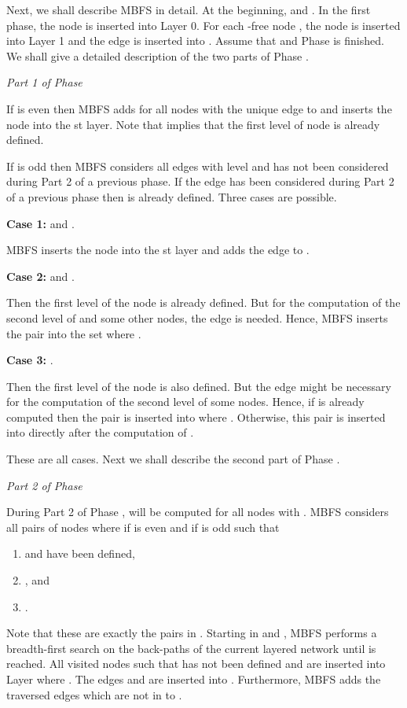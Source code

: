\documentclass[12pt,twoside,a4paper]{article}
\begin{document}
\medskip
Next, we shall describe MBFS in detail.
At the beginning,  and .
In the first phase, the node  is inserted into Layer 0. For each -free node ,
the node  is inserted into Layer 1 and the edge  is inserted into
. Assume that  and Phase  is finished. 
We shall give a detailed description of the two parts of Phase .

\medskip
\noindent
{\em Part 1 of Phase }

\medskip
If  is even then MBFS adds for all nodes  with  
the unique edge  to  and inserts the node  into 
the st layer. Note that  implies that the first level of
node  is already defined.

If  is odd then MBFS considers all edges 
 with level and  has not been considered 
during Part 2 of a previous phase. If the edge  has been considered during
Part 2 of a previous phase then  is already defined. Three cases are possible.

\medskip
\noindent
{\bf Case 1:}  and .

\medskip
MBFS inserts the node  into the st layer and adds the edge
 to .

\medskip
\noindent
{\bf Case 2:}  and .

\medskip
Then the first level of the node  is already defined. But for the computation of the
second level of  and some other nodes, the edge  is needed. Hence, MBFS 
inserts the pair
 into the set  where .

\medskip
\noindent
{\bf Case 3:} .

\medskip
Then the first level of the node  is also defined. 
But the edge  might be necessary for the computation of the second level of 
some nodes. Hence, if  is already computed then the pair  is 
inserted into  where . Otherwise, this pair 
is inserted into  directly after the computation of .

\medskip
These are all cases. Next we shall describe the second part of Phase .

\medskip
\noindent
{\em Part 2 of Phase }

\medskip
During Part 2 of Phase ,  will be computed for all nodes  with
. 
MBFS considers all pairs of nodes  where  if  is even and 
 if  is odd such that
\begin{enumerate}
\item
 and  have been defined,
\item
, and
\item
.
\end{enumerate}
Note that these are exactly the pairs in .
Starting in  and , MBFS performs a breadth-first search on the back-paths 
of the current layered network until  is reached.
All visited nodes  such that  has not been defined
and  are inserted into Layer  where
. 
The edges  and  are inserted into 
. Furthermore, MBFS adds the traversed edges which are not in  
to .
\end{document}

